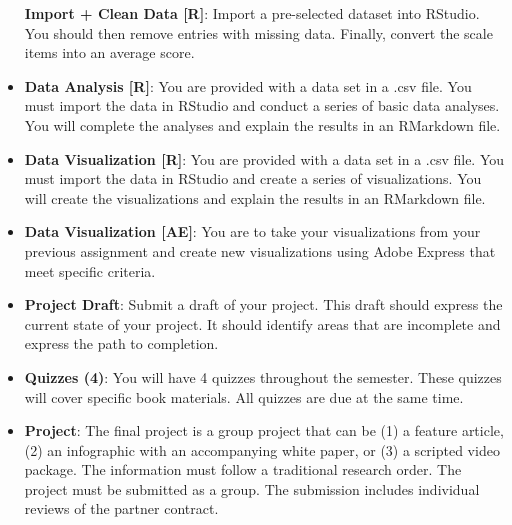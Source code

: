 \documentclass[
]{book}
\begin{document}
\begin{itemize}
  \textbf{Import + Clean Data {[}R{]}}: Import a pre-selected dataset into RStudio. You should then remove entries with missing data. Finally, convert the scale items into an average score.
\item
  \textbf{Data Analysis {[}R{]}}: You are provided with a data set in a .csv file. You must import the data in RStudio and conduct a series of basic data analyses. You will complete the analyses and explain the results in an RMarkdown file.
\item
  \textbf{Data Visualization {[}R{]}}: You are provided with a data set in a .csv file. You must import the data in RStudio and create a series of visualizations. You will create the visualizations and explain the results in an RMarkdown file.
\item
  \textbf{Data Visualization {[}AE{]}}: You are to take your visualizations from your previous assignment and create new visualizations using Adobe Express that meet specific criteria.
\item
  \textbf{Project Draft}: Submit a draft of your project. This draft should express the current state of your project. It should identify areas that are incomplete and express the path to completion.
\item
  \textbf{Quizzes (4)}: You will have 4 quizzes throughout the semester. These quizzes will cover specific book materials. All quizzes are due at the same time.
\item
  \textbf{Project}: The final project is a group project that can be (1) a feature article, (2) an infographic with an accompanying white paper, or (3) a scripted video package. The information must follow a traditional research order. The project must be submitted as a group. The submission includes individual reviews of the partner contract.
\end{itemize}

  
\end{document}

